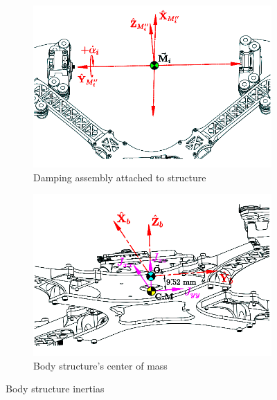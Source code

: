 \begin{figure}[hbtp]
\begin{subfigure}{0.49\textwidth}
\centering
\includegraphics[width=\textwidth]{figs/inertia-damping}
\caption{Damping assembly attached to structure}
\label{fig:inertia-damping}
\end{subfigure}
\begin{subfigure}{0.49\textwidth}
\centering
\includegraphics[width=\textwidth]{figs/inertia-center}
\caption{Body structure's center of mass}
\label{fig:inertia-center}
\end{subfigure}
\caption{Body structure inertias}
\label{fig:damping-center}
\vspace{-10pt}
\end{figure}
\par
